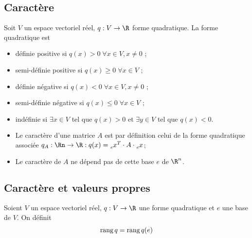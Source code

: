 \subsection{Caractère}

\begin{mydef}
	Soit $V$ un espace vectoriel réel, $q : V \rightarrow \R$ forme quadratique. La forme quadratique est
	\begin{itemize}
		\item définie positive si $q(x) >0 \; \forall x \in V, x \neq 0$ ;
		\item semi-définie positive si $q(x) \geq 0 \; \forall x \in V$ ;
		\item définie négative si $q(x) < 0 \; \forall x \in V, x \neq 0$ ;
		\item semi-définie négative si $q(x) \leq 0 \; \forall x \in V$ ;
		\item indéfinie si $\exists x \in V$ tel que $q(x) > 0$ et $\exists y \in V$ tel que $q(x) < 0$.
	\end{itemize}
\end{mydef}

\begin{myprop}
	\InsertTheoremBreak
	\begin{itemize}
		\item Le caractère d'une matrice $A$ est par définition celui de la forme quadratique associée
			$q_A: \Rn \to \R: q(x) = \tensor[_e]{x}{^T} \cdot A \cdot \tensor[_e]{x}{}$;
		\item Le caractère de $A$ ne dépend pas de cette base $e$ de $\R^n$.
	\end{itemize}
\end{myprop}

\subsection{Caractère et valeurs propres}

\begin{mydef}
	Soient $V$ un espace vectoriel réel, $q : V \rightarrow \R$ une forme quadratique et $e$ une base de $V$.
	On définit
	\[ \operatorname{rang} q = \operatorname{rang} q(e) \]
\end{mydef}

